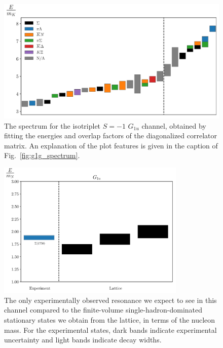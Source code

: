 \begin{figure}[H]
    \centering
    \hspace*{-0.5in}\includegraphics[width=\textwidth]{figures/sigmas/g1u/staircase_mk.pdf}
    \caption[The spectrum for the isotriplet $S=-1$ $G_{1u}$ channel, obtained by fitting the energies and overlap factors of the diagonalized correlator matrix.]{The spectrum for the isotriplet $S=-1$ $G_{1u}$ channel, obtained by fitting the energies and overlap factors of the diagonalized correlator matrix. An explanation of the plot features is given in the caption of Fig.~\ref{fig:g1g_spectrum}.}\label{fig:g1u_spectrum}
\end{figure}

\begin{figure}[H]
    \centering
    \hspace*{-1cm}\includegraphics[width=0.8\textwidth]{figures/sigmas/g1u/expvslat.pdf}
    \caption[The only experimentally observed resonance we expect to see in $G_{1u}$ compared to the finite-volume single-hadron-dominated stationary states we obtain from the lattice, in terms of the nucleon mass.]{The only experimentally observed resonance we expect to see in this channel compared to the finite-volume single-hadron-dominated stationary states we obtain from the lattice, in terms of the nucleon mass. For the experimental states, dark bands indicate experimental uncertainty and light bands indicate decay widths.}\label{fig:g1u_exp}
\end{figure}

